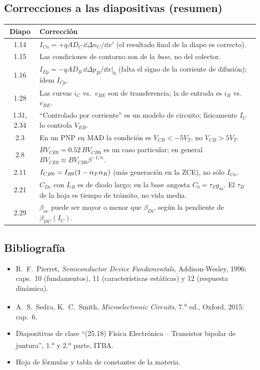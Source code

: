 \subsection{Correcciones a las diapositivas (resumen)}

\begin{table}[H]
\centering\small
\begin{tabularx}{\textwidth}{cX}
\toprule
Diapo & Corrección \\
\midrule
1.14 & $I_{Cn}=+qAD_C\,\dd\Delta n_C/\dd x'$ (el resultado final de la diapo es correcto). \\
1.15 & Las condiciones de contorno son de la \emph{base}, no del colector. \\
1.16 & $I_{Ep}=-qAD_B\,\dd\Delta p_B/\dd x|_0$ (falta el signo de la corriente de difusión); ídem $I_{Cp}$. \\
1.28 & Las curvas $i_C$ vs.\ $v_{BE}$ son de transferencia; la de entrada es $i_B$ vs.\ $v_{BE}$. \\
1.31, 2.34 & ``Controlado por corriente'' es un modelo de circuito; físicamente $I_C$ lo controla $V_{EB}$. \\
2.3 & En un PNP en MAD la condición es $V_{CB}<-5V_T$, no $V_{CB}>5V_T$. \\
2.8 & $BV_{CE0}=0.52\,BV_{CB0}$ es un caso particular; en general $BV_{CE0}\approx BV_{CB0}\beta^{-1/n}$. \\
2.11 & $I_{CB0}=I_{R0}(1-\alpha_F\alpha_R)$ (más generación en la ZCE), no sólo $I_{Cn}$. \\
2.21 & $C_{De}$ con $L_B$ es de diodo largo; en la base angosta $C_b=\tau_Fg_m$. El $\tau_B$ de la hoja es tiempo de tránsito, no vida media. \\
2.29 & $\beta_{ac}$ puede ser mayor o menor que $\beta_{DC}$ según la pendiente de $\beta_{DC}(I_C)$. \\
\bottomrule
\end{tabularx}
\end{table}

\subsection*{Bibliografía}
\begin{itemize}[nosep]
  \item R.~F.~Pierret, \emph{Semiconductor Device Fundamentals}, Addison-Wesley, 1996: caps.~10
  (fundamentos), 11 (características estáticas) y 12 (respuesta dinámica).
  \item A.~S.~Sedra, K.~C.~Smith, \emph{Microelectronic Circuits}, 7.\textsuperscript{a} ed., Oxford, 2015: cap.~6.
  \item Diapositivas de clase ``(25.18) Física Electrónica -- Transistor bipolar de juntura'',
  1.\textsuperscript{a} y 2.\textsuperscript{a} parte, ITBA.
  \item Hoja de fórmulas y tabla de constantes de la materia.
\end{itemize}
